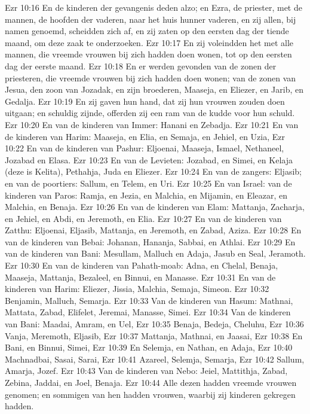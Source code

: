 Ezr 10:16  En de kinderen der gevangenis deden alzo; en Ezra, de priester, met de mannen, de hoofden der vaderen, naar het huis hunner vaderen, en zij allen, bij namen genoemd, scheidden zich af, en zij zaten op den eersten dag der tiende maand, om deze zaak te onderzoeken.
Ezr 10:17  En zij voleindden het met alle mannen, die vreemde vrouwen bij zich hadden doen wonen, tot op den eersten dag der eerste maand.
Ezr 10:18  En er werden gevonden van de zonen der priesteren, die vreemde vrouwen bij zich hadden doen wonen; van de zonen van Jesua, den zoon van Jozadak, en zijn broederen, Maaseja, en Eliezer, en Jarib, en Gedalja.
Ezr 10:19  En zij gaven hun hand, dat zij hun vrouwen zouden doen uitgaan; en schuldig zijnde, offerden zij een ram van de kudde voor hun schuld.
Ezr 10:20  En van de kinderen van Immer: Hanani en Zebadja.
Ezr 10:21  En van de kinderen van Harim: Maaseja, en Elia, en Semaja, en Jehiel, en Uzia,
Ezr 10:22  En van de kinderen van Pashur: Eljoenai, Maaseja, Ismael, Nethaneel, Jozabad en Elasa.
Ezr 10:23  En van de Levieten: Jozabad, en Simei, en Kelaja (deze is Kelita), Pethahja, Juda en Eliezer.
Ezr 10:24  En van de zangers: Eljasib; en van de poortiers: Sallum, en Telem, en Uri.
Ezr 10:25  En van Israel: van de kinderen van Paros: Ramja, en Jezia, en Malchia, en Mijamin, en Eleazar, en Malchia, en Benaja.
Ezr 10:26  En van de kinderen van Elam: Mattanja, Zacharja, en Jehiel, en Abdi, en Jeremoth, en Elia.
Ezr 10:27  En van de kinderen van Zatthu: Eljoenai, Eljasib, Mattanja, en Jeremoth, en Zabad, Aziza.
Ezr 10:28  En van de kinderen van Bebai: Johanan, Hananja, Sabbai, en Athlai.
Ezr 10:29  En van de kinderen van Bani: Mesullam, Malluch en Adaja, Jasub en Seal, Jeramoth.
Ezr 10:30  En van de kinderen van Pahath-moab: Adna, en Chelal, Benaja, Maaseja, Mattanja, Bezaleel, en Binnui, en Manasse.
Ezr 10:31  En van de kinderen van Harim: Eliezer, Jissia, Malchia, Semaja, Simeon.
Ezr 10:32  Benjamin, Malluch, Semarja.
Ezr 10:33  Van de kinderen van Hasum: Mathnai, Mattata, Zabad, Elifelet, Jeremai, Manasse, Simei.
Ezr 10:34  Van de kinderen van Bani: Maadai, Amram, en Uel,
Ezr 10:35  Benaja, Bedeja, Cheluhu,
Ezr 10:36  Vanja, Meremoth, Eljasib,
Ezr 10:37  Mattanja, Mathnai, en Jaasai,
Ezr 10:38  En Bani, en Binnui, Simei,
Ezr 10:39  En Selemja, en Nathan, en Adaja,
Ezr 10:40  Machnadbai, Sasai, Sarai,
Ezr 10:41  Azareel, Selemja, Semarja,
Ezr 10:42  Sallum, Amarja, Jozef.
Ezr 10:43  Van de kinderen van Nebo: Jeiel, Mattithja, Zabad, Zebina, Jaddai, en Joel, Benaja.
Ezr 10:44  Alle dezen hadden vreemde vrouwen genomen; en sommigen van hen hadden vrouwen, waarbij zij kinderen gekregen hadden.



